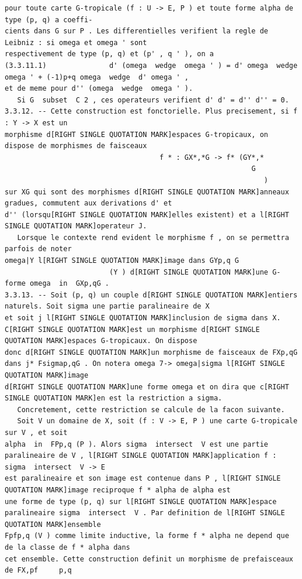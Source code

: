 \documentclass[
  11pt,
]{article}
\begin{document}
\begin{lstlisting}
pour toute carte G-tropicale (f : U -> E, P ) et toute forme alpha de type (p, q) a coeffi-
cients dans G sur P . Les differentielles verifient la regle de Leibniz : si omega et omega ' sont
respectivement de type (p, q) et (p' , q ' ), on a
(3.3.11.1)               d' (omega  wedge  omega ' ) = d' omega  wedge  omega ' + (-1)p+q omega  wedge  d' omega ' ,
et de meme pour d'' (omega  wedge  omega ' ).
   Si G  subset  C 2 , ces operateurs verifient d' d' = d'' d'' = 0.
3.3.12. -- Cette construction est fonctorielle. Plus precisement, si f : Y -> X est un
morphisme d[RIGHT SINGLE QUOTATION MARK]espaces G-tropicaux, on dispose de morphismes de faisceaux
                                     f * : GX*,*G -> f* (GY*,*
                                                           G
                                                              )
sur XG qui sont des morphismes d[RIGHT SINGLE QUOTATION MARK]anneaux gradues, commutent aux derivations d' et
d'' (lorsqu[RIGHT SINGLE QUOTATION MARK]elles existent) et a l[RIGHT SINGLE QUOTATION MARK]operateur J.
   Lorsque le contexte rend evident le morphisme f , on se permettra parfois de noter
omega|Y l[RIGHT SINGLE QUOTATION MARK]image dans GYp,q G
                         (Y ) d[RIGHT SINGLE QUOTATION MARK]une G-forme omega  in  GXp,qG .
3.3.13. -- Soit (p, q) un couple d[RIGHT SINGLE QUOTATION MARK]entiers naturels. Soit sigma une partie paralineaire de X
et soit j l[RIGHT SINGLE QUOTATION MARK]inclusion de sigma dans X. C[RIGHT SINGLE QUOTATION MARK]est un morphisme d[RIGHT SINGLE QUOTATION MARK]espaces G-tropicaux. On dispose
donc d[RIGHT SINGLE QUOTATION MARK]un morphisme de faisceaux de FXp,qG dans j* Fsigmap,qG . On notera omega 7-> omega|sigma l[RIGHT SINGLE QUOTATION MARK]image
d[RIGHT SINGLE QUOTATION MARK]une forme omega et on dira que c[RIGHT SINGLE QUOTATION MARK]en est la restriction a sigma.
   Concretement, cette restriction se calcule de la facon suivante.
   Soit V un domaine de X, soit (f : V -> E, P ) une carte G-tropicale sur V , et soit
alpha  in  FPp,q (P ). Alors sigma  intersect  V est une partie paralineaire de V , l[RIGHT SINGLE QUOTATION MARK]application f : sigma  intersect  V -> E
est paralineaire et son image est contenue dans P , l[RIGHT SINGLE QUOTATION MARK]image reciproque f * alpha de alpha est
une forme de type (p, q) sur l[RIGHT SINGLE QUOTATION MARK]espace paralineaire sigma  intersect  V . Par definition de l[RIGHT SINGLE QUOTATION MARK]ensemble
Fpfp,q (V ) comme limite inductive, la forme f * alpha ne depend que de la classe de f * alpha dans
cet ensemble. Cette construction definit un morphisme de prefaisceaux de FX,pf     p,q

\end{lstlisting}
\end{document}
